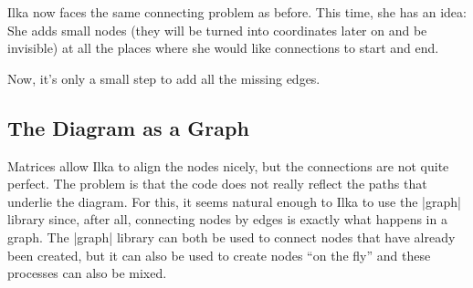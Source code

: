 Ilka now faces the same connecting problem as before. This time, she
has an idea: She adds small nodes (they will be turned into
coordinates later on and be invisible) at all the places
where she would like connections to start and end.
\begin{codeexample}[]
\end{codeexample}
Now, it's only a small step to add all the missing edges.



\subsection{The Diagram as a Graph}

Matrices allow Ilka to align the nodes nicely, but the connections are
not quite perfect. The problem is that the code does not really
reflect the paths that underlie the diagram. For this, it seems
natural enough to Ilka to use the |graph| library since, after all,
connecting nodes by edges is exactly what happens in a graph.
The |graph| library can both be used to connect nodes that have
already been created, but it can also be used to create nodes ``on the
fly'' and these processes can also be mixed.


